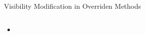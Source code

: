 \documentclass{beamer}
\begin{document}
\begin{frame}[fragile]{Visibility Modification in Overriden Methods}


\begin{lstlisting}[language=Java]

\end{lstlisting}

\begin{itemize}
\item
\end{itemize}


\end{frame}









\end{document}
